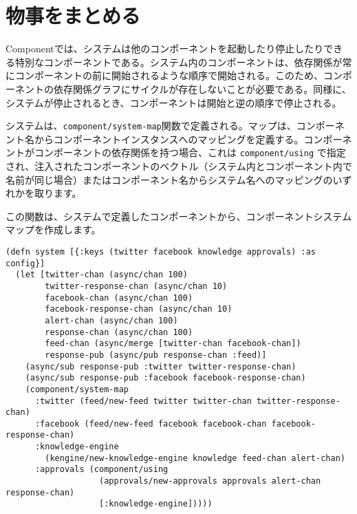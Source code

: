\section{物事をまとめる}

Componentでは、システムは他のコンポーネントを起動したり停止したりできる特別なコンポーネントである。システム内のコンポーネントは、依存関係が常にコンポーネントの前に開始されるような順序で開始される。このため、コンポーネントの依存関係グラフにサイクルが存在しないことが必要である。同様に、システムが停止されるとき、コンポーネントは開始と逆の順序で停止される。

システムは、\texttt{component/system-map}関数で定義される。マップは、コンポーネント名からコンポーネントインスタンスへのマッピングを定義する。コンポーネントがコンポーネントの依存関係を持つ場合、これは \texttt{component/using} で指定され、注入されたコンポーネントのベクトル（システム内とコンポーネント内で名前が同じ場合）またはコンポーネント名からシステム名へのマッピングのいずれかを取ります。

この関数は、システムで定義したコンポーネントから、コンポーネントシステムマップを作成します。

\begin{lstlisting}[numbers=none]
(defn system [{:keys (twitter facebook knowledge approvals) :as config}]
  (let [twitter-chan (async/chan 100)
        twitter-response-chan (async/chan 10)
        facebook-chan (async/chan 100)
        facebook-response-chan (async/chan 10)
        alert-chan (async/chan 100)
        response-chan (async/chan 100)
        feed-chan (async/merge [twitter-chan facebook-chan])
        response-pub (async/pub response-chan :feed)]
    (async/sub response-pub :twitter twitter-response-chan)
    (async/sub response-pub :facebook facebook-response-chan)
    (component/system-map
      :twitter (feed/new-feed twitter twitter-chan twitter-response-chan)
      :facebook (feed/new-feed facebook facebook-chan facebook-response-chan)
      :knowledge-engine
        (kengine/new-knowledge-engine knowledge feed-chan alert-chan)
      :approvals (component/using
                   (approvals/new-approvals approvals alert-chan response-chan)
                   [:knowledge-engine]))))
\end{lstlisting}










